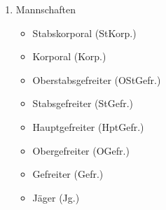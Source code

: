 \begin{enumerate}[label=(\arabic*)]
\begin{enumerate}[label=(\Alph*)]
\begin{itemize}
        \end{itemize}
        \item Mannschaften
        \begin{itemize}
            \item Stabskorporal (StKorp.)
            \item Korporal (Korp.)
            \item Oberstabsgefreiter (OStGefr.)
            \item Stabsgefreiter (StGefr.)
            \item Hauptgefreiter (HptGefr.)
            \item Obergefreiter (OGefr.)
            \item Gefreiter (Gefr.)
            \item Jäger (Jg.)
        \end{itemize}
    \end{enumerate}
\end{enumerate}
